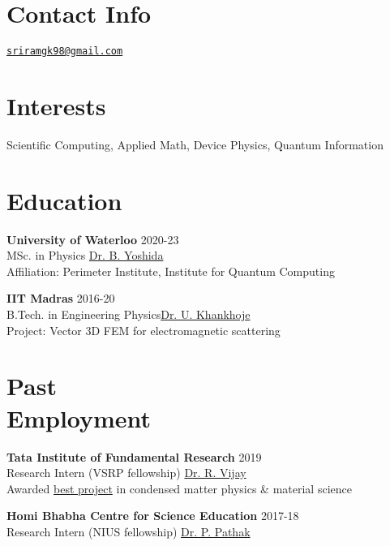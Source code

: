 \documentclass[margin,line]{res}
\begin{document}

\begin{resume}
\section{\sc Contact Info}
\href{mailto:sgopalakrishnan@pitp.ca}{\texttt{sriramgk98@gmail.com}}

\section{\sc Interests}
Scientific Computing, Applied Math, Device Physics, Quantum Information

\section{\sc Education}
{\bf University of Waterloo} \hfill 2020-23\\
MSc. in Physics \hfill  \href{https://perimeterinstitute.ca/people/beni-yoshida}{\sffamily Dr. B. Yoshida}\\
Affiliation: Perimeter Institute, Institute for Quantum Computing

{\bf IIT Madras} \hfill 2016-20 \\
B.Tech. in Engineering Physics\hfill  \href{http://www.ee.iitm.ac.in/uday/index.html}{\sffamily Dr. U. Khankhoje}\\
Project: Vector 3D FEM for electromagnetic scattering

\section{\sc Past\\Employment}
{\bf Tata Institute of Fundamental Research} \hfill 2019\\
Research Intern (VSRP fellowship) \hfill \href{https://www.tifr.res.in/~quantro/people.html}{\sffamily Dr. R. Vijay}\\
Awarded \href{https://sriramgkn.github.io/docs/vsrp_awardcertificate.pdf}{\sffamily best project} in condensed matter physics \& material science

{\bf Homi Bhabha Centre for Science Education} \hfill 2017-18\\
Research Intern (NIUS fellowship) \hfill \href{https://www.hbcse.tifr.res.in/people/scientific/praveen-p-pathak}{\sffamily Dr. P. Pathak}


\end{resume}
\end{document}

